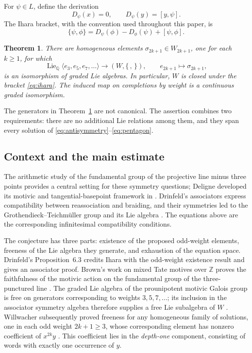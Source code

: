 \documentclass[11pt]{article}
\newtheorem{theorem}{Theorem}[section]
\theoremstyle{definition}
\theoremstyle{remark}
\numberwithin{equation}{section}
\begin{document}
For \(\psi\in L\), define the derivation
\begin{equation}\label{eq:ihara-derivation}
 D_\psi(x)=0,\qquad D_\psi(y)=[y,\psi].
\end{equation}
The Ihara bracket, with the convention used throughout this paper, is
\begin{equation}\label{eq:ihara}
 \{\psi,\phi\}=D_\psi(\phi)-D_\phi(\psi)+[\psi,\phi].
\end{equation}

\begin{theorem}\label{thm:main}
There are homogeneous elements
\(\sigma_{2k+1}\in W_{2k+1}\), one for each \(k\ge1\), for which
\[
 \operatorname{Lie}_{\mathbb Q}\langle e_3,e_5,e_7,\ldots\rangle
 \longrightarrow (W,\{\, ,\,\}),\qquad
 e_{2k+1}\longmapsto\sigma_{2k+1},
\]
is an isomorphism of graded Lie algebras.
In particular, \(W\) is closed under the bracket
\eqref{eq:ihara}.  The induced map on completions by weight is a
continuous graded isomorphism.
\end{theorem}

The generators in Theorem~\ref{thm:main} are not canonical.
The assertion combines two requirements: there are no additional Lie
relations among them, and they span every solution of
\eqref{eq:antisymmetry}--\eqref{eq:pentagon}.

\subsection{Context and the main estimate}
The arithmetic study of the fundamental group of the projective line
minus three points provides a central setting for these symmetry
questions; Deligne developed its motivic and tangential-basepoint
framework in \cite[Introduction and Section~15]{Deligne}.
Drinfeld's associators express compatibility between reassociation and
braiding, and their symmetries led to the
Grothendieck--Teichm\"uller group and its Lie algebra
\cite{Drinfeld}.  The equations above are the corresponding
infinitesimal compatibility conditions.

The conjecture has three parts: existence of the proposed odd-weight
elements, freeness of the Lie algebra they generate, and exhaustion of
the equation space.  Drinfeld's Proposition~6.3 credits Ihara with the
odd-weight existence result and gives an associator proof.
Brown's work on mixed Tate motives over \(\mathbb Z\) proves the
faithfulness of the motivic action on the fundamental group of the
three-punctured line \cite{Brown}.  The graded Lie algebra of the
prounipotent motivic Galois group is free on generators corresponding to weights
\(3,5,7,\ldots\); its inclusion in the associator symmetry algebra
therefore supplies a free Lie subalgebra of \(W\)
\cite[Section~1.4.2]{BrownDepth}.
Willwacher subsequently proved freeness for any homogeneous family of
solutions, one in each odd weight \(2k+1\ge3\), whose corresponding
element has nonzero coefficient of
\(x^{2k}y\) \cite[Theorem~1.2]{WillwacherFree}.
This coefficient lies in the \emph{depth-one} component, consisting of
words with exactly one occurrence of \(y\).
\end{document}
